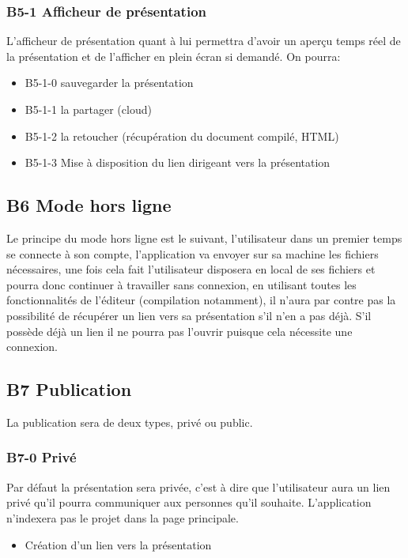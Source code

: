 \documentclass[11pt,a4paper,svgnames]{article}
\begin{document}
\subsubsection{B5-1 Afficheur de présentation}
L'afficheur de présentation quant à lui permettra d'avoir un aperçu temps réel de la présentation et de l'afficher en plein écran si demandé. On pourra:
\begin{itemize}
\item B5-1-0 sauvegarder la présentation
\item B5-1-1 la partager (cloud)
\item B5-1-2 la retoucher (récupération du document compilé, HTML)
\item B5-1-3 Mise à disposition du lien dirigeant vers la présentation
\end{itemize} 

\subsection{B6 Mode hors ligne}
Le principe du mode hors ligne est le suivant, l'utilisateur dans un premier temps se connecte à son compte, l'application va envoyer sur sa machine les fichiers nécessaires, une fois cela fait l'utilisateur disposera en local de ses fichiers et pourra donc continuer à travailler sans connexion, en utilisant toutes les fonctionnalités de l'éditeur (compilation notamment), il n'aura par contre pas la possibilité de récupérer un lien vers sa présentation s'il n'en a pas déjà. S'il possède déjà un lien il ne pourra pas l'ouvrir puisque cela nécessite une connexion.

\subsection{B7 Publication}
La publication sera de deux types, privé ou public.

\subsubsection{B7-0 Privé}
Par défaut la présentation sera privée, c'est à dire que l'utilisateur aura un lien privé qu'il pourra communiquer aux personnes qu'il souhaite. L'application n'indexera pas le projet dans la page principale.
\begin{itemize}
\item Création d'un lien vers la présentation
\end{itemize}
\end{document}
